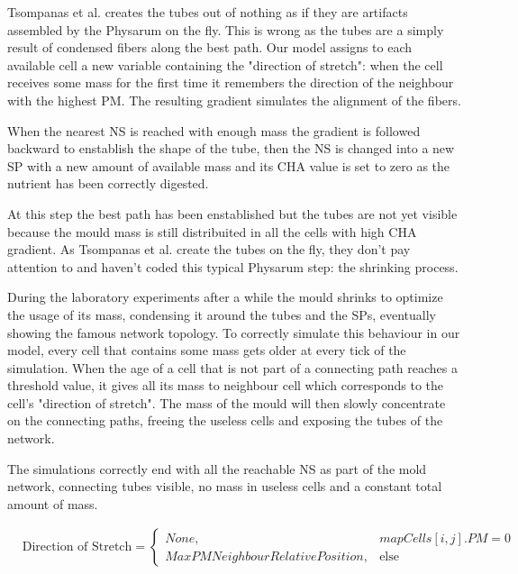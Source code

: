 \par
Tsompanas et al. \cite{Tsompanas2016} creates the tubes out of nothing as if they are artifacts assembled by the Physarum on the fly. This is wrong as the tubes are a simply result of condensed fibers along the best path. Our model assigns to each available cell a new variable containing the "direction of stretch": when the cell receives some mass for the first time it remembers the direction of the neighbour with the highest PM. The resulting gradient simulates the alignment of the fibers.

\par
When the nearest NS is reached with enough mass the gradient is followed backward to enstablish the shape of the tube, then the NS is changed into a new SP with a new amount of available mass and its CHA value is set to zero as the nutrient has been correctly digested.

\par
At this step the best path has been enstablished but the tubes are not yet visible because the mould mass is still distribuited in all the cells with high CHA gradient.
As Tsompanas et al. \cite{Tsompanas2016} create the tubes on the fly, they don't pay attention to and haven't coded this typical Physarum step: the shrinking process.

\par
During the laboratory experiments after a while the mould shrinks to optimize the usage of its mass, condensing it around the tubes and the SPs, eventually showing the famous network topology.
To correctly simulate this behaviour in our model, every cell that contains some mass gets older at every tick of the simulation. When the age of a cell that is not part of a connecting path reaches a threshold value, it gives all its mass to neighbour cell which corresponds to the cell's "direction of stretch". The mass of the mould will then slowly concentrate on the connecting paths, freeing the useless cells and exposing the tubes of the network.

\par
The simulations correctly end with all the reachable NS as part of the mold network, connecting tubes visible, no mass in useless cells and a constant total amount of mass.


\begin{align*} &
\text{Direction of Stretch}=
\begin{cases} 
None, & mapCells[i, j].PM = 0 \\ 
MaxPMNeighbourRelativePosition, & \mbox{else}
\end{cases}
\end{align*}

